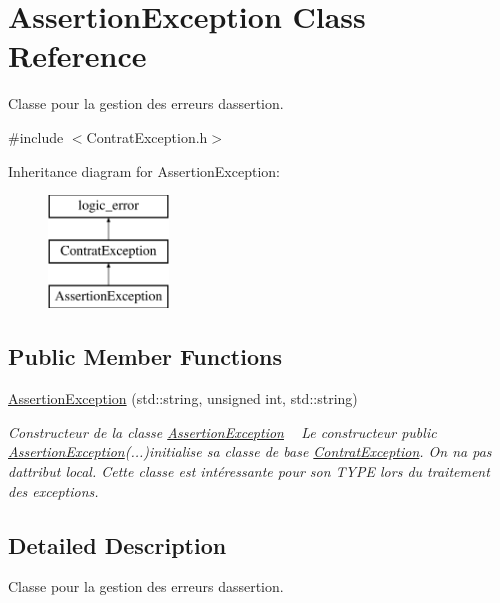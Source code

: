 \hypertarget{classAssertionException}{}\section{Assertion\+Exception Class Reference}
\label{classAssertionException}


Classe pour la gestion des erreurs d\textquotesingle{}assertion.  




{\ttfamily \#include $<$Contrat\+Exception.\+h$>$}

Inheritance diagram for Assertion\+Exception\+:\begin{figure}[H]
\begin{center}
\leavevmode
\includegraphics[height=3.000000cm]{classAssertionException}
\end{center}
\end{figure}
\subsection*{Public Member Functions}
\begin{DoxyCompactItemize}
\item 
\hyperlink{classAssertionException_a93268f249b033bf4596901e50874fde6}{Assertion\+Exception} (std\+::string, unsigned int, std\+::string)
\begin{DoxyCompactList}\small\item\em Constructeur de la classe \hyperlink{classAssertionException}{Assertion\+Exception} ~\newline
 Le constructeur public \hyperlink{classAssertionException}{Assertion\+Exception}(...)initialise sa classe de base \hyperlink{classContratException}{Contrat\+Exception}. On n\textquotesingle{}a pas d\textquotesingle{}attribut local. Cette classe est intéressante pour son T\+Y\+PE lors du traitement des exceptions. \end{DoxyCompactList}\end{DoxyCompactItemize}


\subsection{Detailed Description}
Classe pour la gestion des erreurs d\textquotesingle{}assertion. 

